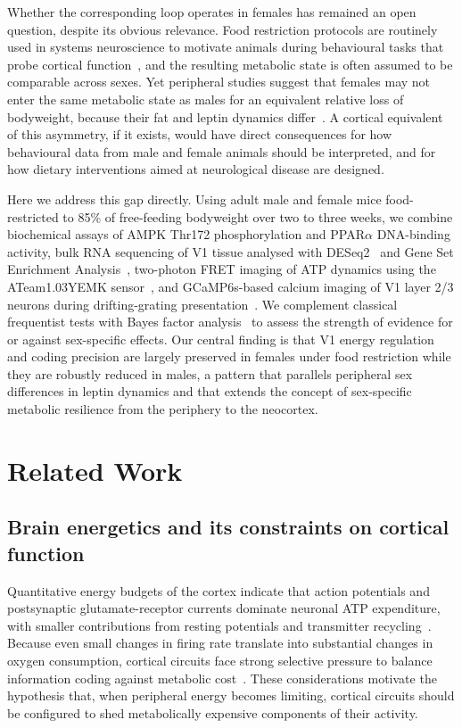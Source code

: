Whether the corresponding loop operates in females has remained an open question, despite its obvious relevance. Food restriction protocols are routinely used in systems neuroscience to motivate animals during behavioural tasks that probe cortical function~\cite{scott2023cisplatin,heinz2021foraging}, and the resulting metabolic state is often assumed to be comparable across sexes. Yet peripheral studies suggest that females may not enter the same metabolic state as males for an equivalent relative loss of bodyweight, because their fat and leptin dynamics differ~\cite{nestor2014crosstalk,kwon2014gpr30,elsehrawy2025eralpha}. A cortical equivalent of this asymmetry, if it exists, would have direct consequences for how behavioural data from male and female animals should be interpreted, and for how dietary interventions aimed at neurological disease are designed.

Here we address this gap directly. Using adult male and female mice food-restricted to 85\% of free-feeding bodyweight over two to three weeks, we combine biochemical assays of AMPK Thr172 phosphorylation and PPAR$\alpha$ DNA-binding activity, bulk RNA sequencing of V1 tissue analysed with DESeq2~\cite{love2014moderated} and Gene Set Enrichment Analysis~\cite{subramanian2005gsea}, two-photon FRET imaging of ATP dynamics using the ATeam1.03YEMK sensor~\cite{imamura2009visualization,tsuyama2013ateam,ando2012visualization,kishikawa2011ateam}, and GCaMP6s-based calcium imaging of V1 layer 2/3 neurons during drifting-grating presentation~\cite{mcclure2019puretones,petousakis2023apical}. We complement classical frequentist tests with Bayes factor analysis~\cite{sekulovski2024bayes} to assess the strength of evidence for or against sex-specific effects. Our central finding is that V1 energy regulation and coding precision are largely preserved in females under food restriction while they are robustly reduced in males, a pattern that parallels peripheral sex differences in leptin dynamics and that extends the concept of sex-specific metabolic resilience from the periphery to the neocortex.

\section{Related Work}

\subsection{Brain energetics and its constraints on cortical function}
Quantitative energy budgets of the cortex indicate that action potentials and postsynaptic glutamate-receptor currents dominate neuronal ATP expenditure, with smaller contributions from resting potentials and transmitter recycling~\cite{attwell2001energy}. Because even small changes in firing rate translate into substantial changes in oxygen consumption, cortical circuits face strong selective pressure to balance information coding against metabolic cost~\cite{niven2008energy}. These considerations motivate the hypothesis that, when peripheral energy becomes limiting, cortical circuits should be configured to shed metabolically expensive components of their activity.

